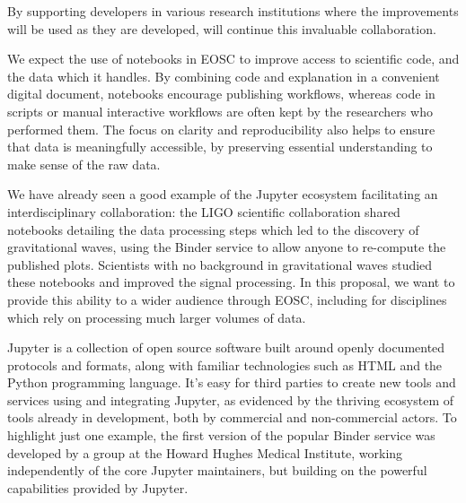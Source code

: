 By supporting developers in various research institutions where the improvements
will be used as they are developed, \TheProject will continue this invaluable
collaboration.


We expect the use of notebooks in EOSC to improve access to scientific code,
and the data which it handles. By combining code and explanation in a convenient
digital document, notebooks encourage publishing workflows, whereas code in
scripts or manual interactive workflows are often kept by the researchers who
performed them. The focus on clarity and reproducibility also helps to ensure
that data is meaningfully accessible, by preserving essential understanding to
make sense of the raw data.

We have already seen a good example of the Jupyter ecosystem facilitating an
interdisciplinary collaboration: the LIGO scientific collaboration shared
notebooks detailing the data processing steps which led to the discovery of
gravitational waves, using the Binder service to allow anyone to re-compute
the published plots. Scientists with no background in gravitational waves
studied these notebooks and improved the signal processing.
In this proposal, we want to provide this ability to a wider audience through
EOSC, including for disciplines which rely on processing much larger volumes of
data.



Jupyter is a collection of open source software built around openly documented
protocols and formats, along with familiar technologies such as HTML and the
Python programming language. It's easy for third parties to create new
tools and services using and integrating Jupyter, as evidenced by the thriving
ecosystem of tools already in development, both by commercial and non-commercial
actors. To highlight just one example, the first version of the popular Binder
service was developed by a group at the Howard Hughes Medical Institute,
working independently of the core Jupyter maintainers, but building on the
powerful capabilities provided by Jupyter.

